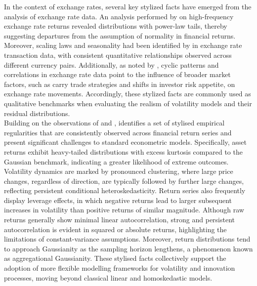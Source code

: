 \documentclass[oneside,12pt]{CUEDthesisPSnPDF}
\newcommand{\textcite}{\citet}
\begin{document}
In the context of exchange rates, several key stylized facts have emerged from the analysis of exchange rate data. An analysis performed by \textcite{julio2015stylized} on high-frequency exchange rate returns revealed distributions with power-law tails, thereby suggesting departures from the assumption of normality in financial returns. Moreover, scaling laws and seasonality had been identified by \textcite{aloud2013stylized} in exchange rate transaction data, with consistent quantitative relationships observed across different currency pairs. Additionally, as noted by \textcite{julio2015stylized}, cyclic patterns and correlations in exchange rate data point to the influence of broader market factors, such as carry trade strategies and shifts in investor risk appetite, on exchange rate movements. Accordingly, these stylized facts are commonly used as qualitative benchmarks when evaluating the realism of volatility models and their residual distributions.\\

Building on the observations of \textcite{julio2015stylized} and \textcite{aloud2013stylized}, \textcite{cont2001empirical} identifies a set of stylised empirical regularities that are consistently observed across financial return series and present significant challenges to standard econometric models. Specifically, asset returns exhibit heavy-tailed distributions with excess kurtosis compared to the Gaussian benchmark, indicating a greater likelihood of extreme outcomes. Volatility dynamics are marked by pronounced clustering, where large price changes, regardless of direction, are typically followed by further large changes, reflecting persistent conditional heteroskedasticity. Return series also frequently display leverage effects, in which negative returns lead to larger subsequent increases in volatility than positive returns of similar magnitude. Although raw returns generally show minimal linear autocorrelation, strong and persistent autocorrelation is evident in squared or absolute returns, highlighting the limitations of constant-variance assumptions. Moreover, return distributions tend to approach Gaussianity as the sampling horizon lengthens, a phenomenon known as aggregational Gaussianity. These stylised facts collectively support the adoption of more flexible modelling frameworks for volatility and innovation processes, moving beyond classical linear and homoskedastic models.\\


\end{document}
